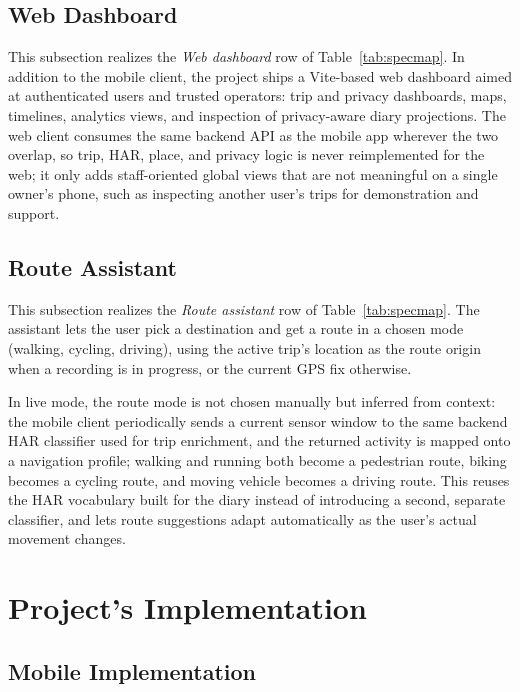 \documentclass[conference,a4paper]{IEEEtran}
\begin{document}
\subsection{Web Dashboard}

This subsection realizes the \textit{Web dashboard} row of Table~\ref{tab:specmap}. In addition to the mobile client, the project ships a Vite-based web dashboard aimed at authenticated users and trusted operators: trip and privacy dashboards, maps, timelines, analytics views, and inspection of privacy-aware diary projections. The web client consumes the same backend API as the mobile app wherever the two overlap, so trip, HAR, place, and privacy logic is never reimplemented for the web; it only adds staff-oriented global views that are not meaningful on a single owner's phone, such as inspecting another user's trips for demonstration and support.

\subsection{Route Assistant}

This subsection realizes the \textit{Route assistant} row of Table~\ref{tab:specmap}. The assistant lets the user pick a destination and get a route in a chosen mode (walking, cycling, driving), using the active trip's location as the route origin when a recording is in progress, or the current GPS fix otherwise.

In live mode, the route mode is not chosen manually but inferred from context: the mobile client periodically sends a current sensor window to the same backend HAR classifier used for trip enrichment, and the returned activity is mapped onto a navigation profile; walking and running both become a pedestrian route, biking becomes a cycling route, and moving vehicle becomes a driving route. This reuses the HAR vocabulary built for the diary instead of introducing a second, separate classifier, and lets route suggestions adapt automatically as the user's actual movement changes.

\section{Project's Implementation}

\subsection{Mobile Implementation}
\end{document}
